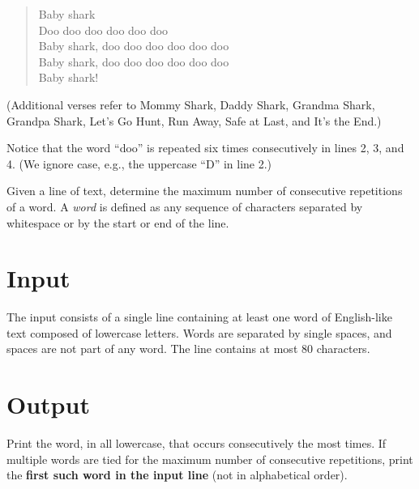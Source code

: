 
\begin{verse}
Baby shark\\
Doo doo doo doo doo doo\\
Baby shark, doo doo doo doo doo doo\\
Baby shark, doo doo doo doo doo doo\\
Baby shark!\\
\end{verse}

(Additional verses refer to Mommy Shark, Daddy Shark, Grandma Shark, Grandpa Shark,
Let’s Go Hunt, Run Away, Safe at Last, and It’s the End.)

Notice that the word ``doo'' is repeated six times consecutively in lines 2, 3, and 4.  
(We ignore case, e.g., the uppercase ``D'' in line 2.)

Given a line of text, determine the maximum number of consecutive repetitions of a word.  
A \emph{word} is defined as any sequence of characters separated by whitespace or by the start or end of the line.

\section*{Input}
The input consists of a single line containing at least one word of English-like text composed of lowercase letters.  
Words are separated by single spaces, and spaces are not part of any word.  
The line contains at most 80 characters.

\section*{Output}
Print the word, in all lowercase, that occurs consecutively the most times.  
If multiple words are tied for the maximum number of consecutive repetitions, print the \textbf{first such word in the input line} (not in alphabetical order).
